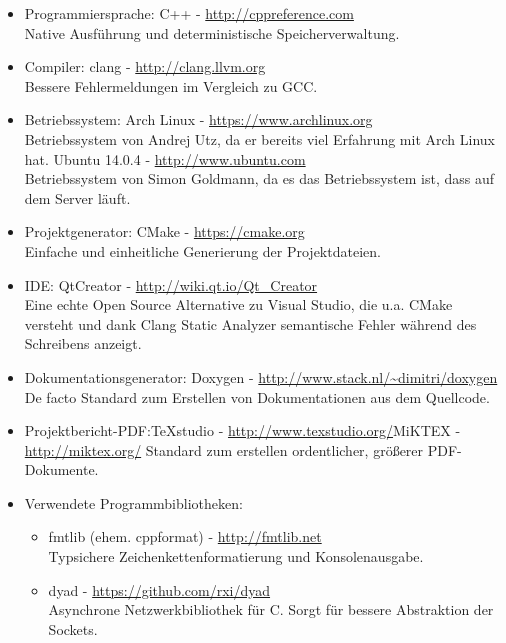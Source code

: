 \documentclass[12pt,a4paper]{article}
\begin{document}
\begin{itemize}
\item Programmiersprache: C++ - \url{http://cppreference.com} \\
Native Ausführung und deterministische Speicherverwaltung.
\item Compiler: clang - \url{http://clang.llvm.org} \\
Bessere Fehlermeldungen im Vergleich zu GCC.
\item Betriebssystem: \newline
Arch Linux - \url{https://www.archlinux.org} \\
Betriebssystem von Andrej Utz, da er bereits viel Erfahrung mit Arch Linux hat. \newline
Ubuntu 14.0.4 - \url{http://www.ubuntu.com} \\
Betriebssystem von Simon Goldmann, da es das Betriebssystem ist, dass auf dem Server läuft.
\item Projektgenerator: CMake - \url{https://cmake.org} \\
Einfache und einheitliche Generierung der Projektdateien.
\item IDE: QtCreator - \url{http://wiki.qt.io/Qt_Creator} \\
Eine echte Open Source Alternative zu Visual Studio, die u.a. CMake versteht und dank Clang Static Analyzer semantische Fehler während des Schreibens anzeigt.
\item Dokumentationsgenerator: Doxygen - \url{http://www.stack.nl/~dimitri/doxygen} \\
De facto Standard zum Erstellen von Dokumentationen aus dem Quellcode.
\item Projektbericht-PDF:\newline TeXstudio - \url{http://www.texstudio.org/}\newline MiKTEX - \url{http://miktex.org/}\newline
Standard zum erstellen ordentlicher, größerer PDF-Dokumente.
\item Verwendete Programmbibliotheken:
\begin{itemize}
\item fmtlib (ehem. cppformat) - \url{http://fmtlib.net} \\
Typsichere Zeichenkettenformatierung und Konsolenausgabe.
\item dyad - \url{https://github.com/rxi/dyad} \\
Asynchrone Netzwerkbibliothek für C. Sorgt für bessere Abstraktion der Sockets.
\end{itemize}

\end{itemize}
\newpage
\end{document}
